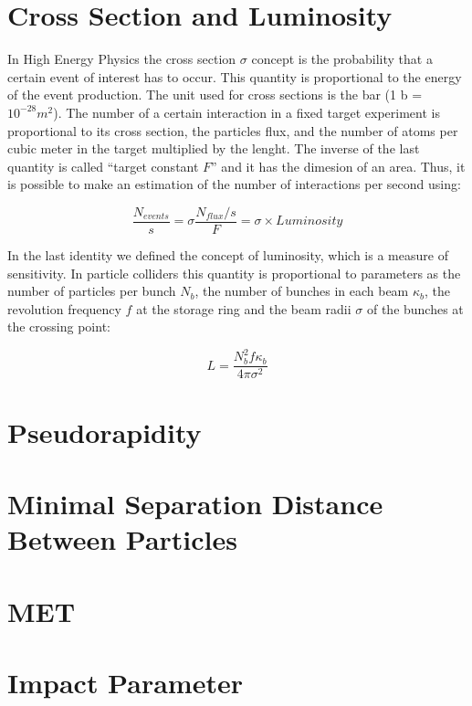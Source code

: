  \section{Cross Section and Luminosity}
 
 In High Energy Physics the cross section $\sigma$ concept is the probability that a certain event of interest has to occur. This quantity is proportional to the energy of the event production. The unit 
 used for cross sections is the bar (1 b = $10^{-28} m^2$). The number of a certain interaction in a fixed target experiment is proportional to its cross section, the particles flux, and the
 number of atoms per cubic meter in the target multiplied by the lenght. The inverse of the last quantity is called ``target constant $F$'' and it has the dimesion of an area. Thus, it is possible
 to make an estimation of the number of interactions per second using:
 
 \begin{equation}
  \frac{N_{events}}{s} = \sigma \frac{N_{flux}/s}{F} = \sigma \times Luminosity
 \end{equation}

 In the last identity we defined the concept of luminosity, which is a measure of sensitivity. In particle colliders this quantity is proportional to parameters as the number of particles per bunch
 $N_b$, the number of bunches in each beam $\kappa_b$, the revolution frequency $f$ at the storage ring and the beam radii $ \sigma$ of the bunches at the crossing point:
 
 \begin{equation}
  L = \frac{N_b^2 f \kappa_b}{4\pi \sigma^2} 
 \end{equation}

 
 \section{Pseudorapidity}
 
 
 \section{Minimal Separation Distance Between Particles}
 
 \section{MET}

 
 \section{Impact Parameter}

 
 